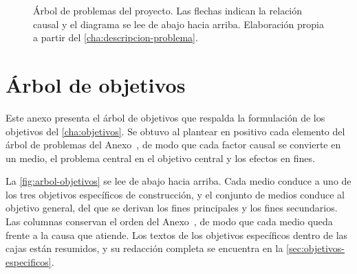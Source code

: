 \begin{figure}[htbp]
  \caption[Árbol de problemas]{Árbol de problemas del proyecto. Las flechas indican la relación causal y el diagrama se lee de abajo hacia arriba. Elaboración propia a partir del \cref{cha:descripcion-problema}.}
  \label{fig:arbol-problemas}
\end{figure}

\chapter{Árbol de objetivos}\label{anx:arbol-objetivos}

Este anexo presenta el árbol de objetivos que respalda la formulación de los objetivos del \cref{cha:objetivos}. Se obtuvo al plantear en positivo cada elemento del árbol de problemas del Anexo~, de modo que cada factor causal se convierte en un medio, el problema central en el objetivo central y los efectos en fines.

La \cref{fig:arbol-objetivos} se lee de abajo hacia arriba. Cada medio conduce a uno de los tres objetivos específicos de construcción, y el conjunto de medios conduce al objetivo general, del que se derivan los fines principales y los fines secundarios. Las columnas conservan el orden del Anexo~, de modo que cada medio queda frente a la causa que atiende. Los textos de los objetivos específicos dentro de las cajas están resumidos, y su redacción completa se encuentra en la \cref{sec:objetivos-especificos}.

